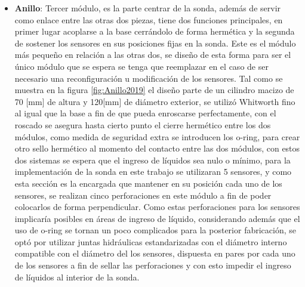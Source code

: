 \begin{itemize}
    \item \textbf{Anillo}: Tercer
    m\'odulo, es la parte centrar de la sonda, adem\'as de servir como enlace 
    entre las otras dos piezas, tiene dos funciones principales, en primer lugar acoplarse a la base cerr\'andolo de forma herm\'etica y la segunda de sostener los sensores en sus posiciones fijas en la sonda. Este es el m\'odulo m\'as peque\~no en relaci\'on a las otras dos, se dise\~no de esta forma para ser el \'unico m\'odulo que se espera se tenga que reemplazar en el caso de ser necesario una reconfiguraci\'on u modificaci\'on de los sensores. Tal como se muestra en la figura \ref{fig:Anillo2019} el dise\~no parte de un cilindro macizo de 70 [mm] de altura y 120[mm] de di\'ametro exterior, se utiliz\'o Whitworth fino al igual que la base a fin de que pueda enroscarse  perfectamente, con el roscado se asegura hasta cierto punto el cierre herm\'etico entre los dos m\'odulos, como medida de seguridad extra se introducen los o-ring, para crear otro  sello hermético al momento del contacto entre las dos m\'odulos, con estos dos sistemas se espera que el ingreso de l\'iquidos sea nulo o m\'inimo, para la implementaci\'on de la sonda en este trabajo se utilizaran 5 sensores, y como esta secci\'on es la encargada que mantener en su posici\'on cada uno de los sensores, se realizan cinco perforaciones en este m\'odulo a fin de poder colocarlos de forma perpendicular. Como estas perforaciones para los sensores implicar\'ia posibles en \'areas de ingreso de l\'iquido, considerando adem\'as que el uso de o-ring se tornan un poco complicados para la posterior fabricaci\'on, se opt\'o por utilizar juntas hidr\'aulicas estandarizadas con el di\'ametro interno compatible con el di\'ametro del los sensores, dispuesta en pares por cada uno de los sensores a fin de sellar las perforaciones y con esto impedir el ingreso de líquidos al interior de la sonda.
    

\end{itemize}
